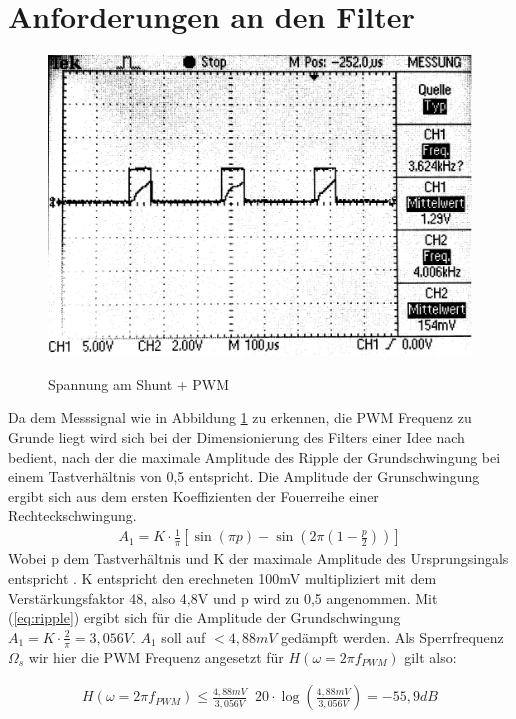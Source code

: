 \documentclass[11pt,twoside,a4paper,openright]{mpreport}
\begin{document}
\section{Anforderungen an den Filter}

\begin{figure}[H]
\centering
\includegraphics[width=.8\textwidth]{oszi.png}\\
\caption{Spannung am Shunt + PWM}%
\label{fig:pwm+i}
\end{figure}

Da dem Messsignal wie in Abbildung \ref{fig:pwm+i} zu erkennen, die PWM Frequenz zu Grunde liegt wird sich bei der Dimensionierung des Filters einer Idee nach \cite{Alter2008} bedient, nach der die maximale Amplitude des Ripple der Grundschwingung bei einem
Tastverhältnis von 0,5 entspricht. Die Amplitude der Grunschwingung ergibt sich aus dem ersten Koeffizienten der Fouerreihe einer Rechteckschwingung.
\begin{align}
A_1 = K\cdot \frac{1}{\pi}[\sin(\pi p)-\sin(2\pi(1-\frac{p}{2}))]
\label{eq:ripple}
\end{align}
Wobei p dem Tastverhältnis und K der maximale Amplitude des Ursprungsingals entspricht \cite{Alter2008}. K entspricht den erechneten 100mV multipliziert mit dem Verstärkungsfaktor 48, also 4,8V und p wird zu 0,5
angenommen. Mit (\ref{eq:ripple}) ergibt sich für die Amplitude der Grundschwingung $ A_1 = K\cdot \frac{2}{\pi} = 3,056V$. $A_1$ soll auf $ < 4,88mV$ gedämpft werden.
Als Sperrfrequenz $\Omega_s $ wir hier die PWM Frequenz angesetzt für $H(\omega=2\pi f_{PWM})$ gilt also:

\begin{align}
H(\omega=2\pi f_{PWM}) \le \frac{4,88mV}{3,056V} \mathop{\hat{=}} 20\cdot\log(\frac{4,88mV}{3,056V})= -55,9 dB
\label{eq:daempfung}
\end{align}
\end{document}
